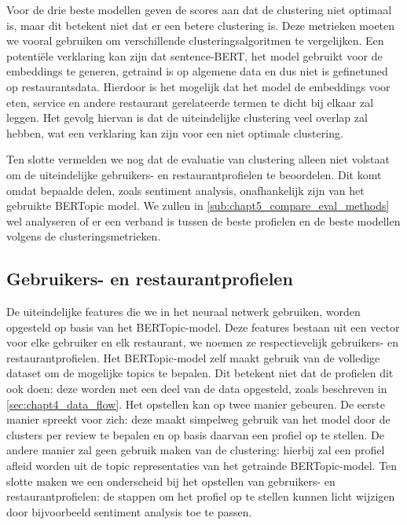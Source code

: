 
Voor de drie beste modellen geven de scores aan dat de clustering niet optimaal is, maar dit betekent niet dat er een betere clustering is. Deze metrieken moeten we vooral gebruiken om verschillende clusteringsalgoritmen te vergelijken. Een potentiële verklaring kan zijn dat sentence-BERT, het model gebruikt voor de embeddings te generen, getraind is op algemene data en dus niet is gefinetuned op restaurantsdata. Hierdoor is het mogelijk dat het model de embeddings voor eten, service en andere restaurant gerelateerde termen te dicht bij elkaar zal leggen. Het gevolg hiervan is dat de uiteindelijke clustering veel overlap zal hebben, wat een verklaring kan zijn voor een niet optimale clustering.

Ten slotte vermelden we nog dat de evaluatie van clustering alleen niet volstaat om de uiteindelijke gebruikers- en restaurantprofielen te beoordelen. Dit komt omdat bepaalde delen, zoals sentiment analysis, onafhankelijk zijn van het gebruikte BERTopic model. We zullen in \autoref{sub:chapt5_compare_eval_methods} wel analyseren of er een verband is tussen de beste profielen en de beste modellen volgens de clusteringsmetrieken.


\subsection{Gebruikers- en restaurantprofielen}
\label{sec:chapt4_nlp_profielen}
De uiteindelijke features die we in het neuraal netwerk gebruiken, worden opgesteld op basis van het BERTopic-model. Deze features bestaan uit een vector voor elke gebruiker en elk restaurant, we noemen ze respectievelijk gebruikers- en restaurantprofielen. Het BERTopic-model zelf maakt gebruik van de volledige dataset om de mogelijke topics te bepalen. Dit betekent niet dat de profielen dit ook doen: deze worden met een deel van de data opgesteld, zoals beschreven in \autoref{sec:chapt4_data_flow}.\newline
Het opstellen kan op twee manier gebeuren. De eerste manier spreekt voor zich: deze maakt simpelweg gebruik van het model door de clusters per review te bepalen en op basis daarvan een profiel op te stellen. De andere manier zal geen gebruik maken van de clustering: hierbij zal een profiel afleid worden uit de topic representaties van het getrainde BERTopic-model. Ten slotte maken we een onderscheid bij het opstellen van gebruikers- en restaurantprofielen: de stappen om het profiel op te stellen kunnen licht wijzigen door bijvoorbeeld sentiment analysis toe te passen.


